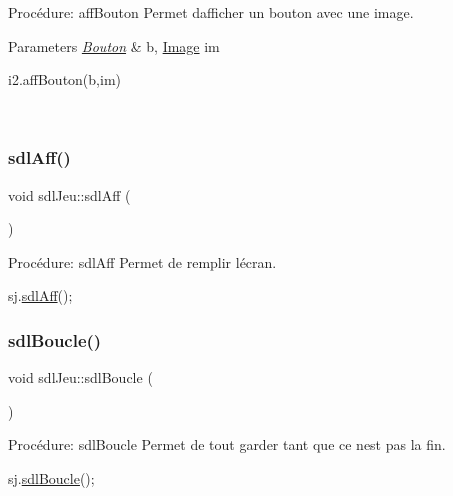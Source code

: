 Procédure\+: aff\+Bouton Permet d\textquotesingle{}afficher un bouton avec une image. 


\begin{DoxyParams}{Parameters}
{\em \hyperlink{classBouton}{Bouton}} & b, \hyperlink{classImage}{Image} im 
\begin{DoxyCode}
i2.affBouton(b,im)
\end{DoxyCode}
 \\
\hline
\end{DoxyParams}
\mbox{\label{classsdlJeu_aedada55e3f96ba37493664d358dc7b60}} 
\subsubsection{\texorpdfstring{sdl\+Aff()}{sdlAff()}}
{\footnotesize\ttfamily void sdl\+Jeu\+::sdl\+Aff (\begin{DoxyParamCaption}{ }\end{DoxyParamCaption})}



Procédure\+: sdl\+Aff Permet de remplir l\textquotesingle{}écran. 


\begin{DoxyCode}
sj.\hyperlink{classsdlJeu_aedada55e3f96ba37493664d358dc7b60}{sdlAff}();
\end{DoxyCode}
 \mbox{\label{classsdlJeu_a5628835d7efcab056985c3aa3de56836}} 
\subsubsection{\texorpdfstring{sdl\+Boucle()}{sdlBoucle()}}
{\footnotesize\ttfamily void sdl\+Jeu\+::sdl\+Boucle (\begin{DoxyParamCaption}{ }\end{DoxyParamCaption})}



Procédure\+: sdl\+Boucle Permet de tout garder tant que ce n\textquotesingle{}est pas la fin. 


\begin{DoxyCode}
sj.\hyperlink{classsdlJeu_a5628835d7efcab056985c3aa3de56836}{sdlBoucle}();
\end{DoxyCode}
 \mbox{\label{classsdlJeu_a75a0ab9c8235020b2d8b99018f074325}} 
